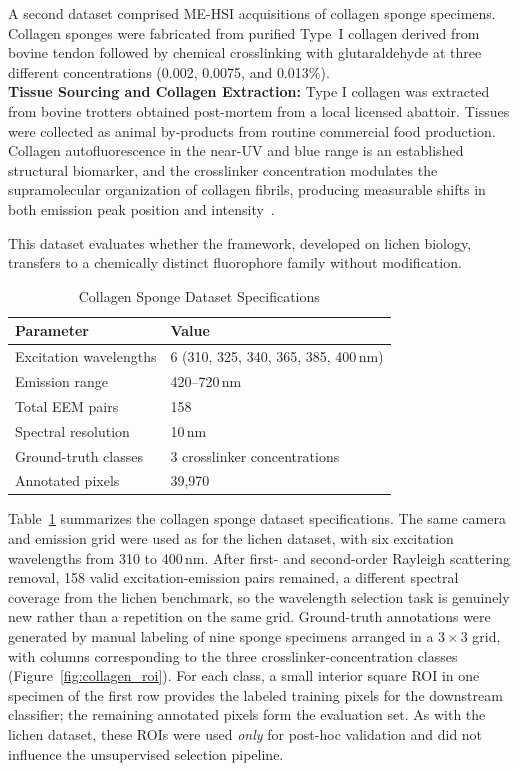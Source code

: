 A second dataset comprised ME-HSI acquisitions of collagen sponge specimens. Collagen sponges were fabricated from purified Type~I collagen derived from bovine tendon followed by chemical crosslinking with glutaraldehyde at three different concentrations (0.002, 0.0075, and 0.013\%).
\\
\textbf{Tissue Sourcing and Collagen Extraction:} Type I collagen was extracted from bovine trotters obtained post-mortem from a local licensed abattoir. Tissues were collected as animal by-products from routine commercial food production.
\\
Collagen autofluorescence in the near-UV and blue range is an established structural biomarker, and the crosslinker concentration modulates the supramolecular organization of collagen fibrils, producing measurable shifts in both emission peak position and intensity~\cite{lakowicz2006principles}.

This dataset evaluates whether the framework, developed on lichen biology, transfers to a chemically distinct fluorophore family without modification.

\begin{table}[!t]
\centering
\caption{Collagen Sponge Dataset Specifications}
\label{tab:dataset_collagen}
\begin{tabular}{@{}ll@{}}
\toprule
\textbf{Parameter} & \textbf{Value} \\
\midrule
Excitation wavelengths & 6 (310, 325, 340, 365, 385, 400\,nm) \\
Emission range & 420--720\,nm \\
Total EEM pairs & 158 \\
Spectral resolution & 10\,nm \\
Ground-truth classes & 3 crosslinker concentrations \\
Annotated pixels & 39{,}970 \\
\bottomrule
\end{tabular}
\end{table}

Table~\ref{tab:dataset_collagen} summarizes the collagen sponge dataset specifications.
The same camera and emission grid were used as for the lichen dataset, with six excitation wavelengths from 310 to 400\,nm. After first- and second-order Rayleigh scattering removal, 158 valid excitation-emission pairs remained, a different spectral coverage from the lichen benchmark, so the wavelength selection task is genuinely new rather than a repetition on the same grid.
Ground-truth annotations were generated by manual labeling of nine sponge specimens arranged in a $3 \times 3$ grid, with columns corresponding to the three crosslinker-concentration classes (Figure~\ref{fig:collagen_roi}).
For each class, a small interior square ROI in one specimen of the first row provides the labeled training pixels for the downstream classifier; the remaining annotated pixels form the evaluation set.
As with the lichen dataset, these ROIs were used \emph{only} for post-hoc validation and did not influence the unsupervised selection pipeline.

